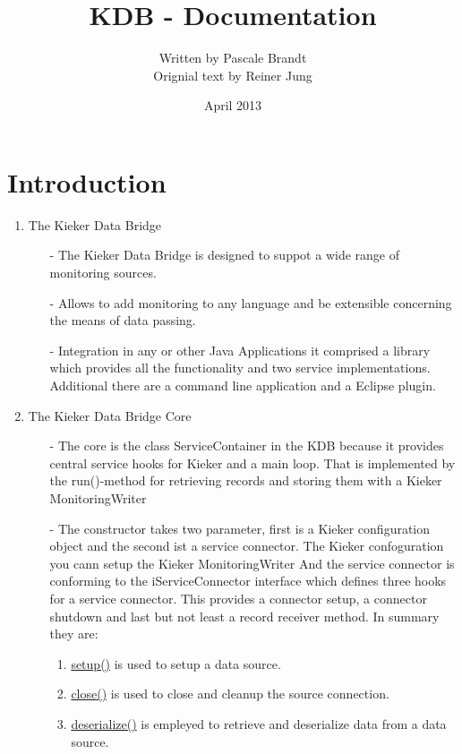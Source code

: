\documentclass[11pt,a4paper]{article}
\title{KDB - Documentation}
\author{Written by Pascale Brandt \\ Orignial text by Reiner Jung}
\date{April 2013}
\begin{document}
\maketitle
\printindex
\section{Introduction}  
\begin{enumerate}


\item The Kieker Data Bridge

\begin{itemize}
\item[-] The Kieker Data Bridge is designed to suppot a wide range of 			monitoring sources.
\item[-] Allows to add monitoring to any language and be extensible concerning the means of data passing.	
\item[-] Integration in any or other Java Applications it comprised a library which provides all the functionality and two service implementations.\newline
Additional there are a command line application and a Eclipse plugin.
\end{itemize}

\item The Kieker Data Bridge Core


\begin{itemize}
\item[-] The core is the class ServiceContainer in the KDB because it provides central service hooks for Kieker and a main loop.\newline
That is implemented by the run()-method for retrieving records and storing them with a Kieker MonitoringWriter
\item[-] The constructor takes two parameter, first is a Kieker configuration object and the second ist a service connector. \newline
The Kieker confoguration you cann setup the Kieker MonitoringWriter\newline
And the service connector is conforming to the iServiceConnector interface which defines three hooks for a service connector. This provides a connector setup, a connector shutdown and last but not least a record receiver method.\newline
In summary they are:\newline

\begin{enumerate}
\item \underline{setup()} is used to setup a data source.\newline
\item \underline{close()} is used to close and cleanup the source connection.
\item \underline{deserialize()} is empleyed to retrieve and deserialize data from a data source.\newline
\end{enumerate}


\end{itemize}
\end{enumerate}
\end{document}
